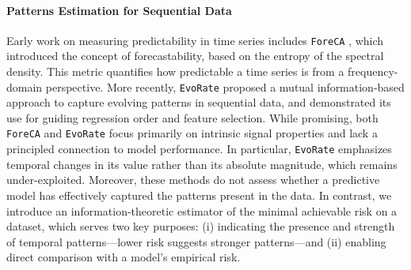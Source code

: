 \documentclass{article}
\begin{document}
\paragraph{Patterns Estimation for Sequential Data}
Early work on measuring predictability in time series includes \texttt{ForeCA} \cite{goerg2013forecastable}, which introduced the concept of forecastability, based on the entropy of the spectral density. This metric quantifies how predictable a time series is from a frequency-domain perspective. More recently, \texttt{EvoRate} \cite{zeng2025towards} proposed a mutual information-based approach to capture evolving patterns in sequential data, and demonstrated its use for guiding regression order and feature selection.
While promising, both \texttt{ForeCA} and \texttt{EvoRate} focus primarily on intrinsic signal properties and lack a principled connection to model performance. In particular, \texttt{EvoRate} emphasizes temporal changes in its value rather than its absolute magnitude, which remains under-exploited. Moreover, these methods do not assess whether a predictive model has effectively captured the patterns present in the data.
In contrast, we introduce an information-theoretic estimator of the minimal achievable risk on a dataset, which serves two key purposes: (i) indicating the presence and strength of temporal patterns—lower risk suggests stronger patterns—and (ii) enabling direct comparison with a model's empirical risk. 
\end{document}
